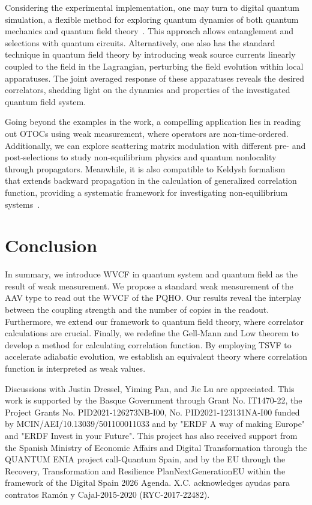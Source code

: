 \documentclass[twocolumn,pra,aps,superscriptaddress]{revtex4-2}
\begin{document}
Considering the experimental implementation, one may turn to digital quantum simulation, a flexible method for exploring quantum dynamics of both quantum mechanics and quantum field theory~\cite{dirac,adscft}. This approach allows entanglement and selections with quantum circuits. Alternatively, one also has the standard technique in quantum field theory by introducing weak source currents linearly coupled to the field in the Lagrangian, perturbing the field evolution within local apparatuses. The joint averaged response of these apparatuses reveals the desired correlators, shedding light on the dynamics and properties of the investigated quantum field system.

Going beyond the examples in the work, a compelling application lies in reading out OTOCs using weak measurement, where operators are non-time-ordered. Additionally, we can explore scattering matrix modulation with different pre- and post-selections to study non-equilibrium physics and quantum nonlocality through propagators. Meanwhile, it is also compatible to Keldysh formalism~\cite{keldysh} that extends backward propagation in the calculation of generalized correlation function, providing a systematic framework for investigating non-equilibrium systems~\cite{noneqprb2003,noneqprd2014,noneqprb2016}.


\section {Conclusion}
In summary, we introduce WVCF in quantum system and quantum field as the result of weak measurement. We propose a standard weak measurement of the AAV type to read out the WVCF of the PQHO. Our results reveal the interplay between the coupling strength and the number of copies in the readout. Furthermore, we extend our framework to quantum field theory, where correlator calculations are crucial. Finally, we redefine the Gell-Mann and Low theorem to develop a method for calculating correlation function. By employing TSVF to accelerate adiabatic evolution, we establish an equivalent theory where correlation function is interpreted as weak values.

\begin{acknowledgements}
Discussions with Justin Dressel, Yiming Pan, and Jie Lu are appreciated. This work is supported by the Basque Government through Grant No. IT1470-22, the Project Grants No. PID2021-126273NB-I00, No. PID2021-123131NA-I00 funded by MCIN/AEI/10.13039/501100011033 and by "ERDF A way of making Europe" and "ERDF Invest in your Future". This project has also received support from the Spanish Ministry of Economic Affairs and Digital Transformation through the QUANTUM ENIA project call-Quantum Spain, and by the EU through the Recovery, Transformation and Resilience PlanNextGenerationEU within the framework of the Digital Spain 2026 Agenda. X.C. acknowledges ayudas para contratos Ram\'{o}n y Cajal-2015-2020 (RYC-2017-22482).
\end{acknowledgements}
\end{document}
